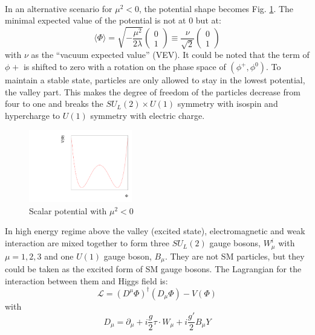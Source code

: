 \\In an alternative scenario for $\mu^2 < 0$, the potential shape becomes Fig. \ref{Fig:higgs}. The minimal expected value of the potential is not at 0 but at:
\begin{equation}
\label{Eq:min}
\langle\Phi\rangle=\sqrt{-\frac{\mu^2}{2\lambda}}\left(  \begin{array}{ c } 0 \\ 1\end{array} \right) \equiv\frac{\nu}{\sqrt{2}}\left(  \begin{array}{ c } 0 \\ 1\end{array} \right)
\end{equation}
with $\nu$ as the ``vacuum expected value'' (VEV). It could be noted that the term of $\phi^{}+$ is shifted to zero with a rotation on the phase space of $(\phi^{+},\phi^0)$. To maintain a stable state, particles are only allowed to stay in the lowest potential, the valley part. This makes the degree of freedom of the particles decrease from four to one and breaks the $SU_L(2)\times U(1)$ symmetry with isospin and hypercharge to $U(1)$ symmetry with electric charge.  
\begin{figure}[!h]                
	\includegraphics[width=0.4\textwidth]{Chapter1/higgs.pdf}
	\centering
	\begin{center}
		\caption{Scalar potential with $\mu^2 < 0$}
		\label{Fig:higgs}            
	\end{center}
\end{figure}
In high energy regime above the valley (excited state), electromagnetic and weak interaction are mixed together to form three $SU_L(2)$ gauge bosons, $W^i_\mu$ with $\mu =1,2,3$ and one $U(1)$ gauge boson, $B_\mu$. They are not SM particles, but they could be taken as the excited form of SM gauge bosons. The Lagrangian for the interaction between them and Higgs field is:
\begin{equation}
 \mathcal{L}=(D^\mu\Phi)^\dagger(D_\mu\Phi) - V(\Phi) 
\end{equation}
with
\begin{equation}
 D_\mu = \partial_\mu+i\frac{g}{2}\tau\cdot W_\mu+i\frac{g'}{2}B_\mu Y
 \label{Eq:electroweak symmetry Lagrange}  
\end{equation}
